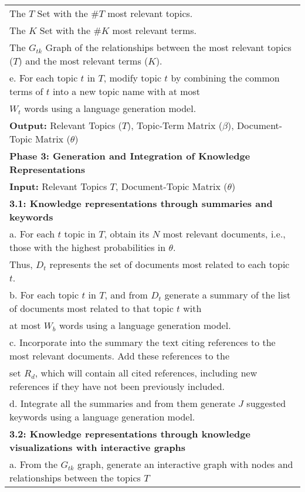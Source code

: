\documentclass[runningheads]{llncs}
\begin{document}
\begin{figure*}[!h]
\begin{tabular}{l}
		\quad \quad The $T$ Set with the $\#T$ most relevant topics. \\
		\quad \quad The $K$ Set with the $\#K$ most relevant terms. \\
		\quad \quad The $G_{tk}$ Graph of the relationships between the most relevant topics ($T$) and the most relevant terms ($K$). \\
		\quad e. For each topic $t$ in $T$, modify topic $t$ by combining the common terms of $t$ into a new topic name with at most \\
		\quad \quad $W_{t}$ words using a language generation model.\\
		\quad \textbf{Output:} Relevant Topics ($T$), Topic-Term Matrix ($\beta$), Document-Topic Matrix ($\theta$) \\
		\textbf{Phase 3: Generation and Integration of Knowledge Representations} \\
		\quad \textbf{Input:} Relevant Topics $T$, Document-Topic Matrix ($\theta$) \\
		\quad \textbf{3.1: Knowledge representations through summaries and keywords}\\
		\quad \quad a. For each $t$ topic in $T$, obtain its $N$ most relevant documents, i.e., those with the highest probabilities in $\theta$. \\
		\quad \quad \quad Thus, $D_t$ represents the set of documents most related to each topic $t$.\\
		\quad \quad b. For each topic $t$ in $T$, and from $D_t$ generate a summary of the list of documents most related to that topic $t$ with \\
		\quad \quad \quad at most $W_b$ words using a language generation model. \\
		\quad \quad c. Incorporate into the summary the text citing references to the most relevant documents. Add these references to the \\ 
		\quad \quad \quad set $R_d$, which will contain all cited references, including new references if they have not been previously included.\\
		\quad \quad d. Integrate all the summaries and from them generate $J$ suggested keywords using a language generation model.\\
		\quad \textbf{3.2: Knowledge representations through knowledge visualizations with interactive graphs}\\
		\quad \quad a. From the $G_{tk}$ graph, generate an interactive graph with nodes and relationships between the topics $T$\\

\end{tabular}
\end{figure*}
\end{document}

